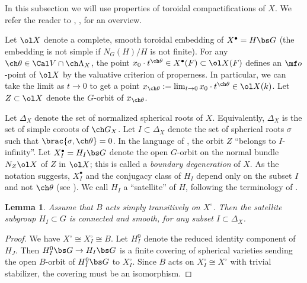 \documentclass[final]{amsart}
\newtheorem{lem}[subsubsection]{Lemma}
\theoremstyle{remark}
\theoremstyle{definition}
\numberwithin{equation}{section}
\begin{document}
\subsubsection{}
In this subsection we will use properties of toroidal compactifications of 
$X$. We refer the reader to \cite[\S 2.3-2.5]{SV}, \cite{KnLV}, \cite[\S 8]{GN} for an overview. 

Let $\ol X$ denote a complete, smooth toroidal embedding of $X^\bullet=H\bs G$ 
(the embedding is not 
simple if $N_G(H)/H$ is not finite). 
For any $\ch\theta \in \Cal V \cap \ch\Lambda_X$, the point 
$x_0 \cdot t^{\ch\theta} \in X^\bullet(F) \subset \ol X(F)$ defines
an $\mf o$-point of $\ol X$ by the valuative criterion of properness. 
In particular, we can take the limit as $t\to 0$ to get a point $x_{\ch\theta}
:= \lim_{t\to 0} x_0 \cdot t^{\ch\theta} \in\ol X(k)$.
Let $Z \subset \ol X$ denote the $G$-orbit of $x_{\ch\theta}$. 

Let $\Delta_X$ denote the set of normalized spherical roots of $X$.
Equivalently, $\Delta_X$ is the set of simple coroots of $\ch G_X$. 
Let $I \subset \Delta_X$ denote the set of spherical roots $\sigma$ 
such that $\brac{\sigma, \ch\theta}=0$. In the language of \cite[\S 2.3.6]{SV}, 
the orbit $Z$ ``belongs to $I$-infinity''. Let $X_I^\bullet = H_I\bs G$ denote 
the open $G$-orbit on the normal bundle $N_Z \ol X$ of $Z$ in $\ol X$; 
this is called a \emph{boundary degeneration} of $X$. 
As the notation suggests, $X_I^\bullet$ and the conjugacy class of $H_I$ depend only on the subset $I$
and not $\ch\theta$ (see \cite[Proposition 2.5.3]{SV}). We call $H_I$ a ``satellite'' of $H$,
following the terminology of \cite{BM}.


\begin{lem} \label{lem:H_I-conn}
Assume that $B$ acts simply transitively on $X^\circ$. 
Then the satellite subgroup $H_I \subset G$ is connected and smooth, for any subset $I\subset \Delta_X$.
\end{lem}
\begin{proof}
We have $X^\circ \cong X_I^\circ \cong B$. 
Let $H^0_I$ denote the reduced identity component of $H_J$.
Then $H^0_I\bs G \to H_I\bs G$ is a finite covering of spherical varieties sending the open $B$-orbit 
of $H^0_I\bs G$ to $X^\circ_I$. Since $B$ acts on $X^\circ_I\cong X^\circ$ with 
trivial stabilizer, the covering must be an isomorphism. 
\end{proof}
\end{document}
